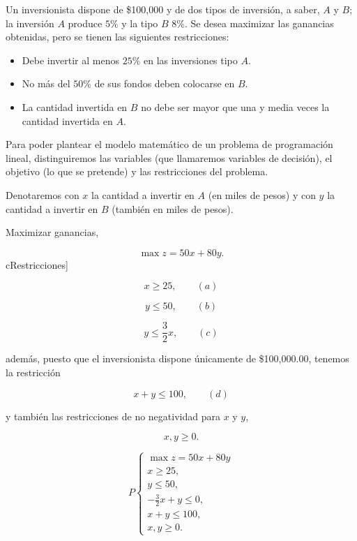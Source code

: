 \begin{Ejem}

Un inversionista dispone de \$100,000 y de dos tipos de inversi\'on, a saber, $A$ y $B$; la inversi\'on $A$ produce $5\%$ y la tipo $B$ $8\%$. Se desea maximizar las ganancias obtenidas, pero se tienen las siguientes restricciones:

\begin{itemize}
\item[(a)] Debe invertir al menos $25\%$ en las inversiones tipo $A$.
\item[(b)] No m\'as del $50\%$ de sus fondos deben colocarse en $B$.
\item[(c)] La cantidad invertida en $B$ no debe ser mayor que una y media veces la cantidad invertida en $A$.
\end{itemize}

Para poder plantear el modelo matem\'atico de un problema de programaci\'on lineal, distinguiremos las variables (que llamaremos variables de decisi\'on), el objetivo (lo que se pretende) y las restricciones del problema.

\begin{tcolorbox}[title=Variables de decisi\'on.] Denotaremos con $x$ la cantidad a invertir en $A$ (en miles de pesos) y con $y$ la cantidad a invertir en $B$ (tambi\'en en miles de pesos).
\end{tcolorbox}


\begin{tcolorbox}[title=Funci\'on objetivo.] Maximizar ganancias,

\[
\max z = 50x + 80y.
\]
cRestricciones]

\[
x \ge 25, \qquad (a)
\]

\[
y \le 50, \qquad (b)
\]

\[
y \le \frac{3}{2}x, \qquad (c)
\]
\end{tcolorbox}

adem\'as, puesto que el inversionista dispone \'unicamente de \$100,000.00, tenemos la restricci\'on

\[
x + y \le 100, \qquad (d)
\]

y tambi\'en las restricciones de no negatividad para $x$ y $y$,

\[
x,y \ge 0.
\]

\begin{tcolorbox}[title= El problema queda planteado como un problema de programaci\'on lineal de la siguiente manera:]
\[
P
\begin{cases}
\max z = 50x + 80y \\
x \ge 25,\\
y \le 50,\\
-\frac{3}{2}x + y \le 0,\\
x + y \le 100,\\
x,y \ge 0.
\end{cases}
\]
\end{tcolorbox}
\end{Ejem}

